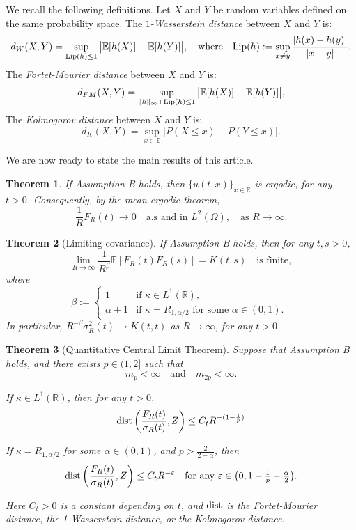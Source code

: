 \documentclass[12pt]{article}
\newtheorem{theorem}{Theorem}[section]
\def\bE{\mathbb{E}}
\def\bR{\mathbb{R}}
\def\e{\varepsilon}
\def\k{\kappa}
\begin{document}
We recall the following definitions. Let $X$ and $Y$ be random variables defined on the same probability space.
The {\em $1$-Wasserstein distance} between $X$ and $Y$ is:
\[
d_{W}(X,Y)=\sup_{{\rm Lip}(h) \leq 1} \big|\bE[h(X)]-\bE[h(Y)]\big|, \quad
\mbox{where} \quad
{\rm Lip}(h):=\sup_{x \not=y}\frac{|h(x)-h(y)|}{|x-y|}.
\]
The {\em Fortet-Mourier distance} between $X$ and $Y$ is:
\[
d_{FM}(X,Y)=\sup_{\|h\|_{\infty}+{\rm Lip}(h) \leq 1} \big|\bE[h(X)]-\bE[h(Y)]\big|,
\]
The {\em Kolmogorov distance} between $X$ and $Y$ is:
\[
d_{K}(X,Y)=\sup_{x \in \bE} \big|P(X \leq x)-P(Y \leq x)\big|.
\]



We are now ready to state the main results of this article.

\begin{theorem}
\label{ergodic-th}
If Assumption B holds, then $\{u(t,x)\}_{x\in \bR}$ is ergodic, for any $t>0$. Consequently, by the mean ergodic theorem,
\[
\frac{1}{R}F_R(t) \to 0 \quad \mbox{a.s and in $L^2(\Omega)$}, \quad \mbox{as $R \to \infty$}.
\]
\end{theorem}

\begin{theorem}[Limiting covariance]
\label{cov-th}
If Assumption B holds, then
for any $t,s>0$,
\[
\lim_{R \to \infty}\frac{1}{R^{\beta}}\bE[F_R(t) F_R(s)]=K(t,s) \quad \mbox{is finite},
\] 
where 
\begin{equation}
\label{def-beta}
\beta:=\left\{
\begin{array}{ll} 1 & \mbox{if $\k \in L^1(\bR)$,} \\
\alpha+1 & \mbox{if $\k=R_{1,\alpha/2}$ for some $\alpha \in (0,1)$. }
\end{array} \right.
\end{equation}
In particular, $R^{-\beta} \sigma_R^2(t) \to K(t,t)$ as $R \to \infty$, for any $t>0$.
\end{theorem}



\begin{theorem}[Quantitative Central Limit Theorem]
\label{QCLT}
Suppose that Assumption B holds, and there exists $p \in (1,2]$ such that 
\begin{equation}
\label{mp-m2p}
m_{p}<\infty \quad \mbox{and} \quad m_{2p}<\infty.
\end{equation}


If $\k \in L^1(\bR)$, then
for any $t>0$,
\[
{\rm dist}\left( \frac{F_R(t)}{\sigma_R(t)},Z\right) \leq  C_t R^{-(1-\frac{1}{p})}
\]


If $\k=R_{1,\alpha/2}$ for some $\alpha \in (0,1)$, and $p>\frac{2}{2-\alpha}$, then
\[
{\rm dist}\left( \frac{F_R(t)}{\sigma_R(t)},Z\right) \leq
C_t R^{-\e}  \quad \mbox{for any $\varepsilon \in \big(0, 1-\frac{1}{p}-\frac{\alpha}{2}\big)$}.
\]

Here $C_t>0$ is a constant depending on $t$, and ${\rm dist}$ is the Fortet-Mourier distance, the 1-Wasserstein distance, or the Kolmogorov distance.
\end{theorem}
\end{document}
